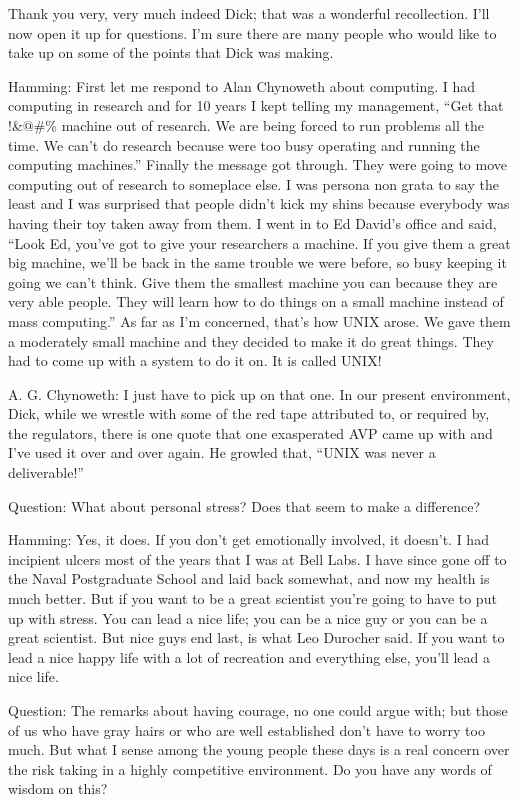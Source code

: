 \documentclass{article}
\begin{document}
Thank you very, very much indeed Dick; that was a wonderful recollection. I'll now open it up for questions. I'm sure there are many people who would like to take up on some of the points that Dick was making.

Hamming: First let me respond to Alan Chynoweth about computing. I had computing in research and for 10 years I kept telling my management, ``Get that !\&@\#\% machine out of research. We are being forced to run problems all the time. We can't do research because were too busy operating and running the computing machines.'' Finally the message got through. They were going to move computing out of research to someplace else. I was persona non grata to say the least and I was surprised that people didn't kick my shins because everybody was having their toy taken away from them. I went in to Ed David's office and said, ``Look Ed, you've got to give your researchers a machine. If you give them a great big machine, we'll be back in the same trouble we were before, so busy keeping it going we can't think. Give them the smallest machine you can because they are very able people. They will learn how to do things on a small machine instead of mass computing.'' As far as I'm concerned, that's how UNIX arose. We gave them a moderately small machine and they decided to make it do great things. They had to come up with a system to do it on. It is called UNIX!

A. G. Chynoweth: I just have to pick up on that one. In our present environment, Dick, while we wrestle with some of the red tape attributed to, or required by, the regulators, there is one quote that one exasperated AVP came up with and I've used it over and over again. He growled that, ``UNIX was never a deliverable!''

Question: What about personal stress? Does that seem to make a difference?

Hamming: Yes, it does. If you don't get emotionally involved, it doesn't. I had incipient ulcers most of the years that I was at Bell Labs. I have since gone off to the Naval Postgraduate School and laid back somewhat, and now my health is much better. But if you want to be a great scientist you're going to have to put up with stress. You can lead a nice life; you can be a nice guy or you can be a great scientist. But nice guys end last, is what Leo Durocher said. If you want to lead a nice happy life with a lot of recreation and everything else, you'll lead a nice life.

Question: The remarks about having courage, no one could argue with; but those of us who have gray hairs or who are well established don't have to worry too much. But what I sense among the young people these days is a real concern over the risk taking in a highly competitive environment. Do you have any words of wisdom on this?
\end{document}
